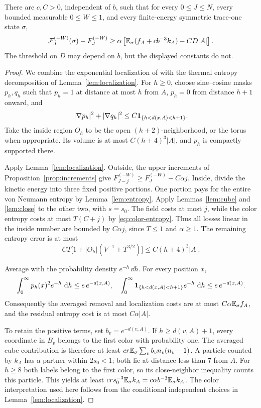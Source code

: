 \begin{proposition}\label{prop:local-penalty}
There are $c,C>0$, independent of $b$, such that for every
$0\le J\le N$, every bounded measurable $0\le W\le1$, and every
finite-energy symmetric trace-one state $\sigma$,
\begin{equation}\label{eq:local-penalty}
 \mathcal F_J^{(-W)}(\sigma)-F_J^{(-W)}
 \ge\alpha\left[\mathbb E_\sigma(f_A+cb^{-3}k_A)-CD|A|\right].
\end{equation}
The threshold on $D$ may depend on $b$, but the displayed constants
do not.
\end{proposition}

\begin{proof}
We combine the exponential localization of
\citet[Section~3, ``Exponential spatial localization'']{HS} with
the thermal entropy decomposition of Lemma~\ref{lem:localization}.
For $h\ge0$, choose sine--cosine masks $p_h,q_h$ such that
$p_h=1$ at distance at most $h$ from $A$, $p_h=0$ from distance
$h+1$ onward, and
\[
 |\nabla p_h|^2+|\nabla q_h|^2
 \le C\mathbf 1_{\{h<d(x,A)<h+1\}}.
\]
Take the inside region $O_h$ to be the open $(h+2)$-neighborhood,
or the torus when appropriate. Its volume is at most
$C(h+4)^3|A|$, and $p_h$ is compactly supported there.

Apply Lemma~\ref{lem:localization}. Outside, the upper increments of
Proposition~\ref{prop:increments} give
$F_{J-j}^{(-W)}\ge F_J^{(-W)}-C\alpha j$.
Inside, divide the kinetic energy into three fixed positive portions.
One portion pays for the entire von Neumann entropy by
Lemma~\ref{lem:entropy}. Apply Lemmas~\ref{lem:cube} and
\ref{lem:close} to the other two, with $s=s_0$. The field costs
at most $j$, while the color entropy costs at most $T(C+j)$ by
\eqref{eq:color-entropy}. Thus all losses linear in the inside
number are bounded by $C\alpha j$, since $T\le1$ and $\alpha\ge1$.
The remaining entropy error is at most
\[
 CT\bigl[1+|O_h|(V^{-1}+T^{3/2})\bigr]
 \le C(h+4)^3|A|.
\]

Average with the probability density $e^{-h}\,\dd h$.
For every position $x$,
\[
 \int_0^\infty p_h(x)^2e^{-h}\,\,\mathrm d h\le e\,e^{-d(x,A)},
 \quad
 \int_0^\infty\mathbf 1_{\{h<d(x,A)<h+1\}}e^{-h}\,\,\mathrm d h
 \le e\,e^{-d(x,A)}.
\]
Consequently the averaged removal and localization costs are at most
$C\alpha\mathbb E_\sigma f_A$, and the residual entropy cost is at most
$C\alpha|A|$.

To retain the positive terms, set $b_v=e^{-d(v,A)}$. If
$h\ge d(v,A)+1$, every coordinate in $B_v$ belongs to the first
color with probability one. The averaged cube contribution is therefore
at least
$cr\mathbb E_\sigma\sum_v b_vn_v(n_v-1)$.
A particle counted by $k_A$ has a partner within $2s_0<1$;
both lie at distance less than $7$ from $A$. For $h\ge8$ both
labels belong to the first color, so its close-neighbor inequality
counts this particle. This yields at least
$crs_0^{-3}\mathbb E_\sigma k_A=c\alpha b^{-3}\mathbb E_\sigma k_A$.
The color interpretation used here follows from the conditional
independent choices in Lemma~\ref{lem:localization}.


\end{proof}
